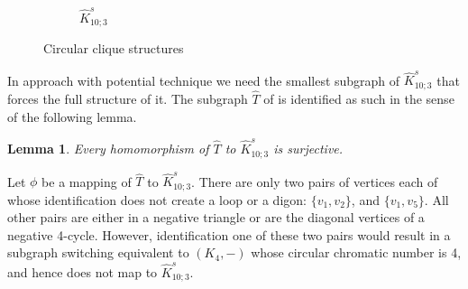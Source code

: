 \documentclass[11pt,a4paper]{article}
\makeatletter
\renewenvironment{proof}[1][\proofname]{\par
	\pushQED{\qed}%
	\normalfont \topsep6\p@\@plus6\p@\relax
	\trivlist
	\item[\hskip\labelsep
	\bfseries
	#1\@addpunct{.}]\ignorespaces
}{%
	\popQED\endtrivlist\@endpefalse
}
\newtheorem{lemma}[theorem]{Lemma}
\theoremstyle{definition}
\makeatother
\begin{document}
\begin{figure}[h!]
\begin{subfigure}[t]{0.45\textwidth}
			\caption{$\widehat{K}_{10;3}^s$}
		\end{subfigure}
		
		\caption{Circular clique structures}
		\label{fig:circular_clique}
	\end{figure}
	
	

			
	In approach with potential technique we need the smallest subgraph of $\widehat{K}_{10;3}^s$ that forces the full structure of it. The subgraph  $\widehat{T}$ of  is identified as such in the sense of the following lemma. 	
	\begin{lemma}\label{lem:T}
		Every homomorphism of $\widehat{T}$ to $\widehat{K}^s_{10;3}$ is surjective.  
	\end{lemma}
	
	\begin{proof}
		Let $\phi$ be a mapping of $\widehat{T}$ to $\widehat{K}^s_{10;3}$. There are only two pairs of vertices each of whose identification does not create a loop or a digon: $\{v_1,v_2\}$, and $\{v_1,v_5\}$. All other pairs are either in a negative triangle or are the diagonal vertices of a negative 4-cycle. However, identification one of these two pairs would result in a subgraph switching equivalent to $(K_4,-)$ whose circular chromatic number is 4, and hence does not map to $\widehat{K}^s_{10;3}$. 
	\end{proof}
	
\end{document}
